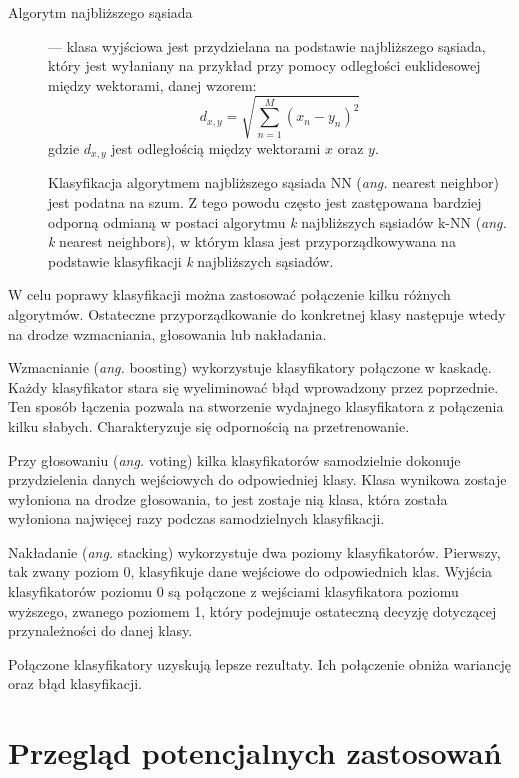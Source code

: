 \documentclass[skorowidz,skroty]{dyplomWEZUT}
\begin{document}
\begin{description}
    \item [Algorytm najbliższego sąsiada] --- klasa wyjściowa jest przydzielana na podstawie najbliższego sąsiada, który jest wyłaniany na przykład przy pomocy odległości euklidesowej między wektorami, danej wzorem\cite{bci_introduction}: 
    $$d_{x,y} = \sqrt{\sum_{n=1}^{M}(x_n-y_n)^2}$$
    gdzie $d_{x,y}$ jest odległością między wektorami $x$ oraz $y$.

    Klasyfikacja algorytmem najbliższego sąsiada NN (\textit{ang.} nearest neighbor) jest podatna na szum\cite{bci_introduction}. Z tego powodu często jest zastępowana bardziej odporną odmianą w postaci algorytmu \textit{k} najbliższych sąsiadów k-NN (\textit{ang.} \textit{k} nearest neighbors), w którym klasa jest przyporządkowywana na podstawie klasyfikacji \textit{k} najbliższych sąsiadów.
\end{description}

W celu poprawy klasyfikacji można zastosować połączenie kilku różnych algorytmów. Ostateczne przyporządkowanie do konkretnej klasy następuje wtedy na drodze wzmacniania, głosowania lub nakładania.

Wzmacnianie (\textit{ang.} boosting) wykorzystuje klasyfikatory połączone w kaskadę. Każdy klasyfikator stara się wyeliminować błąd wprowadzony przez poprzednie. Ten sposób łączenia pozwala na stworzenie wydajnego klasyfikatora z połączenia kilku słabych. Charakteryzuje się odpornością na przetrenowanie\cite{bci_trends}.

Przy głosowaniu (\textit{ang.} voting) kilka klasyfikatorów samodzielnie dokonuje przydzielenia danych wejściowych do odpowiedniej klasy. Klasa wynikowa zostaje wyłoniona na drodze głosowania, to jest zostaje nią klasa, która została wyłoniona najwięcej razy podczas samodzielnych klasyfikacji.

Nakładanie (\textit{ang.} stacking) wykorzystuje dwa poziomy klasyfikatorów. Pierwszy, tak zwany poziom 0, klasyfikuje dane wejściowe do odpowiednich klas. Wyjścia klasyfikatorów poziomu 0 są połączone z wejściami klasyfikatora poziomu wyższego, zwanego poziomem 1, który podejmuje ostateczną decyzję dotyczącej przynależności do danej klasy\cite{eeg_classification}.

Połączone klasyfikatory uzyskują lepsze rezultaty. Ich połączenie obniża wariancję oraz błąd klasyfikacji\cite{eeg_classification}.


\section{Przegląd potencjalnych zastosowań}
\end{document}
